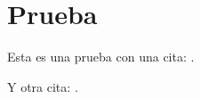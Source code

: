 \documentclass[spanish,12pt,letterpaper]{book}
\begin{document}
\chapter{Prueba}

Esta es una prueba con una cita: \cite{acosta2019construccion}.

Y otra cita: \cite{bondielli2019survey}.



\end{document}
